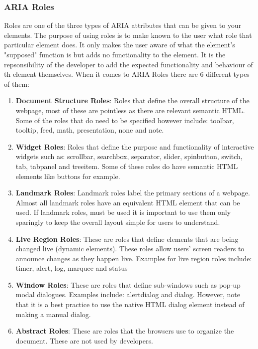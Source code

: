 \documentclass[11pt]{article}
\begin{document}
\subsubsection{ARIA Roles}
\label{sec:org410bf00}
Roles are one of the three types of ARIA attributes that can be given to your elements. The purpose
of using roles is to make known to the user what role that particular element does. It only makes
the user aware of what the element's "supposed" function is but adds no functionality to the
element. It is the repsonsibility of the developer to add the expected functionality and behaviour
of th element themselves.
When it comes to ARIA Roles there are 6 different types of them:
\begin{enumerate}
\item \textbf{Document Structure Roles}: Roles that define the overall structure of the webpage, most of these
are pointless as there are relevant semantic HTML. Some of the roles that do need to be specified
however include: toolbar, tooltip, feed, math, presentation, none and note.
\item \textbf{Widget Roles}: Roles that define the purpose and functionality of interactive widgets such as:
scrollbar, searchbox, separator, slider, spinbutton, switch, tab, tabpanel and treeitem. Some of
these roles do have semantic HTML elements like buttons for example.
\item \textbf{Landmark Roles}: Landmark roles label the primary sections of a webpage. Almost all landmark roles
have an equivalent HTML element that can be used. If landmark roles, must be used it is important
to use them only sparingly to keep the overall layout simple for users to understand.
\item \textbf{Live Region Roles}: These are roles that define elements that are being changed live (dynamic
elements). These roles allow users' screen readers to announce changes as they happen
live. Examples for live region roles include: timer, alert, log, marquee and status
\item \textbf{Window Roles}: These are roles that define sub-windows such as pop-up modal dialogues. Examples
include: alertdialog and dialog. However, note that it is a best practice to use the native HTML
dialog element instead of making a manual dialog.
\item \textbf{Abstract Roles}: These are roles that the browsers use to organize the document. These are not
used by developers.
\end{enumerate}
\end{document}
